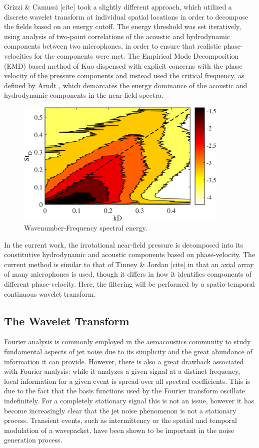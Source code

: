 Grizzi \& Camussi [cite] took a slightly different approach, which utilized a discrete wavelet transform at individual spatial locations in order to decompose the fields based on an energy cutoff. 
The energy threshold was set iteratively, using analysis of two-point correlations of the acoustic and hydrodynamic components between two microphones, in order to ensure that realistic phase-velocities for the components were met. 
The Empirical Mode Decomposition (EMD) based method of Kuo \etal [cite] dispensed with explicit concerns with the phase velocity of the pressure components and instead used the critical frequency, as defined by Arndt \etal [cite], which demarcates the energy dominance of the acoustic and hydrodynamic components in the near-field spectra.
\begin{figure}
	\centering
	\includegraphics[width=4in]{Figures/Phase_Velocity_Map.png}
	\caption{Wavenumber-Frequency spectral energy.}
	\label{fig:phase_velocity_map}
\end{figure}

In the current work, the irrotational near-field pressure is decomposed into its constitutive hydrodynamic and acoustic components based on phase-velocity. 
The current method is similar to that of Tinney \& Jordan [cite] in that an axial array of many microphones is used, though it differs in how it identifies components of different phase-velocity.
Here, the filtering will be performed by a spatio-temporal continuous wavelet transform.

\subsection{The Wavelet Transform}
Fourier analysis is commonly employed in the aeroacoustics community to study fundamental aspects of jet noise due to its simplicity and the great abundance of information it can provide. 
However, there is also a great drawback associated with Fourier analysis: while it analyzes a given signal at a distinct frequency, local information for a given event is spread over all spectral coefficients. 
This is due to the fact that the basis functions used by the Fourier transform oscillate indefinitely. 
For a completely stationary signal this is not an issue, however it has become increasingly clear that the jet noise phenomenon is not a stationary process.
Transient events, such as intermittency or the spatial and temporal modulation of a wavepacket, have been shown to be important in the noise generation process. 

